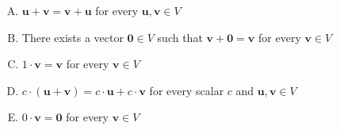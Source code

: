 \documentclass[12pt]{amsart}
\begin{document}
\begin{enumerate}[(A)]
\item $\mathbf{u} + \mathbf{v} = \mathbf{v} + \mathbf{u}$ for every $\mathbf{u}, \mathbf{v} \in V$
\item There exists a vector $\mathbf{0} \in V$ such that $\mathbf{v} + \mathbf{0} = \mathbf{v}$ for every $\mathbf{v} \in V$
\item $1 \cdot \mathbf{v} = \mathbf{v}$ for every $\mathbf{v} \in V$
\item $c \cdot (\mathbf{u} + \mathbf{v}) = c \cdot \mathbf{u} + c \cdot \mathbf{v}$ for every scalar $c$ and $\mathbf{u}, \mathbf{v} \in V$
\item $0 \cdot \mathbf{v} = \mathbf{0}$ for every $\mathbf{v} \in V$
\end{enumerate}

%
%
%
\end{document}

